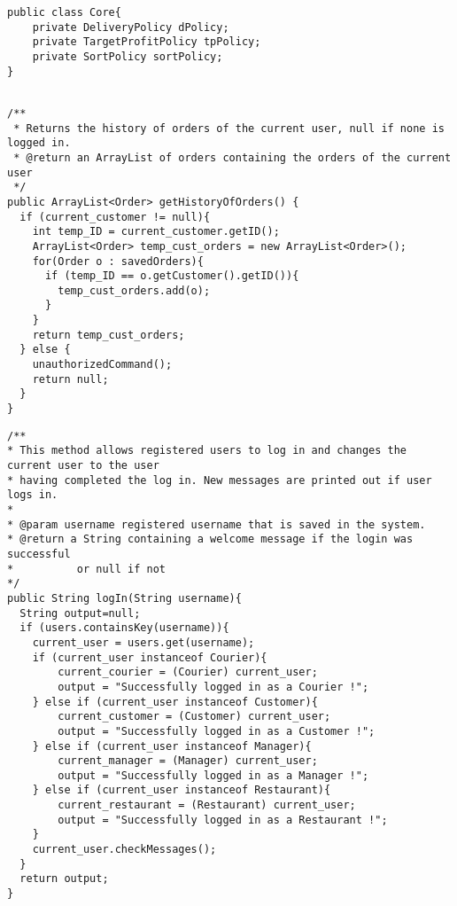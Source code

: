 \begin{lstlisting}[caption=Aggregation applied to the \Core~and its policies.,
  label=lst:aggregationCore]
public class Core{
    private DeliveryPolicy dPolicy;
    private TargetProfitPolicy tpPolicy;
    private SortPolicy sortPolicy;
}
  
\end{lstlisting}


\begin{lstlisting}[caption=Application of the \texttt{current\_customer}
  concept to \texttt{getHistoryOfOrders}.,
  label=lst:historyOfOrders]
/**
 * Returns the history of orders of the current user, null if none is logged in.
 * @return an ArrayList of orders containing the orders of the current user
 */
public ArrayList<Order> getHistoryOfOrders() {
  if (current_customer != null){
    int temp_ID = current_customer.getID();
    ArrayList<Order> temp_cust_orders = new ArrayList<Order>();
    for(Order o : savedOrders){
      if (temp_ID == o.getCustomer().getID()){
        temp_cust_orders.add(o);
      }
    }
    return temp_cust_orders;
  } else {
    unauthorizedCommand();
    return null;
  }
}
\end{lstlisting}

\begin{lstlisting}[caption=the main methods for the log in log out system.,
  label=lst:login]
/**
* This method allows registered users to log in and changes the current user to the user 
* having completed the log in. New messages are printed out if user logs in.
* 
* @param username registered username that is saved in the system.
* @return a String containing a welcome message if the login was successful
* 		   or null if not
*/
public String logIn(String username){
  String output=null;
  if (users.containsKey(username)){
    current_user = users.get(username);
    if (current_user instanceof Courier){
    	current_courier = (Courier) current_user;
    	output = "Successfully logged in as a Courier !";
    } else if (current_user instanceof Customer){
    	current_customer = (Customer) current_user;
    	output = "Successfully logged in as a Customer !";
    } else if (current_user instanceof Manager){
    	current_manager = (Manager) current_user;
    	output = "Successfully logged in as a Manager !";
    } else if (current_user instanceof Restaurant){
    	current_restaurant = (Restaurant) current_user;
    	output = "Successfully logged in as a Restaurant !";
    }
    current_user.checkMessages(); 
  }
  return output;
}
\end{lstlisting}


